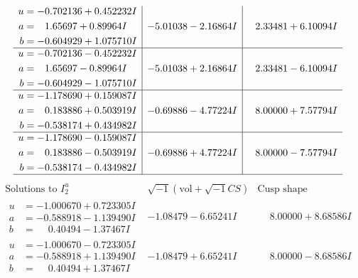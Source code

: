 \documentclass[1p]{elsarticle_modified}
\theoremstyle{definition}
\newcommand{\I}{\sqrt{-1}}
\begin{document}
$$\begin{array}{c|c|c}
\begin{aligned}
u &= -0.702136 + 0.452232 I \\
a &= \phantom{-}1.65697 + 0.89964 I \\
b &= -0.604929 + 1.075710 I\end{aligned}
 & -5.01038 - 2.16864 I & \phantom{-}2.33481 + 6.10094 I \\ \hline\begin{aligned}
u &= -0.702136 - 0.452232 I \\
a &= \phantom{-}1.65697 - 0.89964 I \\
b &= -0.604929 - 1.075710 I\end{aligned}
 & -5.01038 + 2.16864 I & \phantom{-}2.33481 - 6.10094 I \\ \hline\begin{aligned}
u &= -1.178690 + 0.159087 I \\
a &= \phantom{-}0.183886 + 0.503919 I \\
b &= -0.538174 + 0.434982 I\end{aligned}
 & -0.69886 - 4.77224 I & \phantom{-}8.00000 + 7.57794 I \\ \hline\begin{aligned}
u &= -1.178690 - 0.159087 I \\
a &= \phantom{-}0.183886 - 0.503919 I \\
b &= -0.538174 - 0.434982 I\end{aligned}
 & -0.69886 + 4.77224 I & \phantom{-}8.00000 - 7.57794 I\\
 \hline 
 \end{array}$$\newpage$$\begin{array}{c|c|c}  
\text{Solutions to }I^u_{2}& \I (\text{vol} + \sqrt{-1}CS) & \text{Cusp shape}\\
 \hline 
\begin{aligned}
u &= -1.000670 + 0.723305 I \\
a &= -0.588918 - 1.139490 I \\
b &= \phantom{-}0.40494 - 1.37467 I\end{aligned}
 & -1.08479 - 6.65241 I & \phantom{-}8.00000 + 8.68586 I \\ \hline\begin{aligned}
u &= -1.000670 - 0.723305 I \\
a &= -0.588918 + 1.139490 I \\
b &= \phantom{-}0.40494 + 1.37467 I\end{aligned}
 & -1.08479 + 6.65241 I & \phantom{-}8.00000 - 8.68586 I \\ \hline\begin{aligned}

\end{aligned}
\end{array}$$
\end{document}
